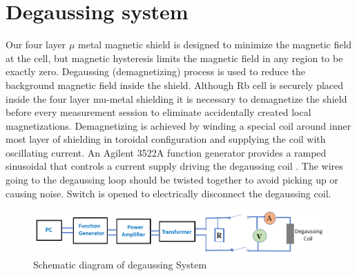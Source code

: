 \section{Degaussing system\label{sec:Degaussing}}
Our four layer $\mu$ metal magnetic shield is designed to minimize the magnetic field at the cell, but
magnetic hysteresis limits the magnetic field in any region to be exactly zero. Degaussing (demagnetizing) process is used to reduce the background magnetic field inside the shield. Although Rb cell is securely placed inside the four layer mu-metal shielding it is necessary to demagnetize the shield before every measurement session  to eliminate accidentally created local magnetizations.
Demagnetizing is achieved by winding a special coil around inner most layer of shielding  in toroidal configuration
and supplying the coil with oscillating current. An Agilent 3522A function generator  provides a ramped sinusoidal that controls a current supply driving the degaussing coil \cite{Martin:2014foa}. The wires going to the degaussing loop should be twisted together to avoid picking up or causing noise. Switch is opened to electrically disconnect the degaussing coil.
 
\begin{figure}[h]
\centering
\includegraphics[width=1.0\linewidth]{figures/degaussing_system}
\caption{Schematic diagram of degaussing System}
\end{figure}

